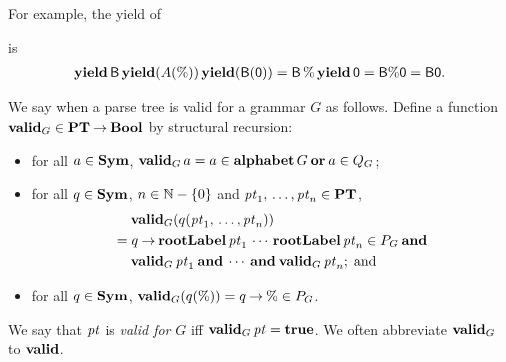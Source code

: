For example, the yield of
\begin{center}

\end{center}
is
\begin{gather*}
\mathbf{yield}\,\mathsf{B}\,\mathbf{yield}(A(\%))\,\mathbf{yield}(\mathsf{B}(\mathsf{0})) =
\mathsf{B}\,\%\,\mathbf{yield}\,\mathsf{0}=\mathsf{B}\%\mathsf{0}=\mathsf{B}\mathsf{0} .
\end{gather*}

%
%
We say when a parse tree is valid for a grammar $G$ as follows.
Define a function $\mathbf{valid}_G\in\mathbf{PT}\mathbin{\to}\mathbf{Bool}$ by
structural recursion:
\begin{itemize}
\item for all $a\in\mathbf{Sym}$, $\mathbf{valid}_G\,a=a\in
\mathbf{alphabet}\,G\mathbin{\mathbf{or}} a\in Q_G$;

\item for all $q\in\mathbf{Sym}$, $n\in\mathbb{N}-\{0\}$ and
${\it pt}_1,\,\ldots,{\it pt}_n\in\mathbf{PT}$,
\begin{align*}
&\quad\; \mathbf{valid}_G(q({\it pt}_1,\,\ldots,{\it pt}_n)) \\
&= q\mathbin{\to}\mathbf{rootLabel}\,{\it pt}_1\,\cdots\,\mathbf{rootLabel}\,{\it pt}_n\in P_G \mathbin{\mathbf{and}}{} \\
&\quad\;
\mathbf{valid}_G\,{\it pt}_1 \mathbin{\mathbf{and}}\, \cdots\, \mathbin{\mathbf{and}} \mathbf{valid}_G\,{\it pt}_n; \;\allowbreak\mbox{and}\allowbreak\;
\end{align*}

\item for all $q\in\mathbf{Sym}$, $\mathbf{valid}_G(q(\%))=q\mathbin{\to}\%\in
P_G$.
\end{itemize}
We say that ${\it pt}$ is \emph{valid for} $G$ iff $\mathbf{valid}_G\,{\it pt}=\mathbf{true}$.
We often abbreviate $\mathbf{valid}_G$ to $\mathbf{valid}$.

